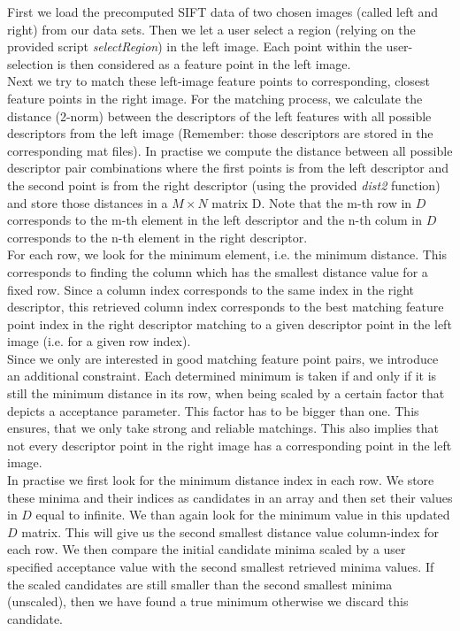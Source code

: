 \documentclass{paper}
\begin{document}
First we load the precomputed SIFT data of two chosen images (called left and right) from our data sets. Then we let a user select a region (relying on the provided script \emph{selectRegion}) in the left image. Each point within the user-selection is then considered as a feature point in the left image. \\

Next we try to match these left-image feature points to corresponding, closest feature points in the right image. For the matching process, we calculate the distance (2-norm) between the descriptors of the left features with all possible descriptors from the left image (Remember: those descriptors are stored in the corresponding mat files). In practise we compute the distance between all possible descriptor pair combinations where the first points is from the left descriptor and the second point is from the right descriptor (using the provided \emph{dist2} function) and store those distances in a $M \times N$ matrix D. Note that the m-th row in $D$ corresponds to the m-th element in the left descriptor and the n-th colum in $D$ corresponds to the n-th element in the right descriptor. \\

For each row, we look for the minimum element, i.e. the minimum distance. This corresponds to finding the column which has the smallest distance value for a fixed row. Since a column index corresponds to the same index in the right descriptor, this retrieved column index corresponds to the best matching feature point index in the right descriptor matching to a given descriptor point in the left image (i.e. for a given row index). \\

Since we only are interested in good matching feature point pairs, we introduce an additional constraint. Each determined minimum is taken if and only if it is still the minimum distance in its row, when being scaled by a certain factor that depicts a acceptance parameter. This factor has to be bigger than one. This ensures, that we only take strong and reliable matchings. This also implies that not every descriptor point in the right image has a corresponding point in the left image. \\

In practise we first look for the minimum distance index in each row. We store these minima and their indices as candidates in an array and then set their values in $D$ equal to infinite. We than again look for the minimum value in this updated $D$ matrix. This will give us the second smallest distance value column-index for each row. We then compare the initial candidate minima scaled by a user specified acceptance value with the second smallest retrieved minima values. If the scaled candidates are still smaller than the second smallest minima (unscaled), then we have found a true minimum otherwise we discard this candidate. \\
\end{document}
